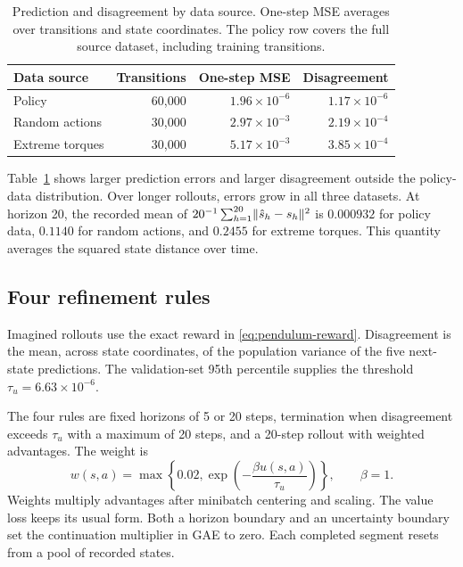 \begin{table}[t]
\centering
\caption{Prediction and disagreement by data source. One-step MSE averages over transitions and state coordinates. The policy row covers the full source dataset, including training transitions.}
\label{tab:prediction}
\begin{tabular}{lrrr}
\toprule
Data source & Transitions & One-step MSE & Disagreement\\
\midrule
Policy & 60,000 & $1.96\times10^{-6}$ & $1.17\times10^{-6}$\\
Random actions & 30,000 & $2.97\times10^{-3}$ & $2.19\times10^{-4}$\\
Extreme torques & 30,000 & $5.17\times10^{-3}$ & $3.85\times10^{-4}$\\
\bottomrule
\end{tabular}
\end{table}

Table~\ref{tab:prediction} shows larger prediction errors and larger disagreement outside the policy-data distribution. Over longer rollouts, errors grow in all three datasets. At horizon 20, the recorded mean of $20^{-1}\sum_{h=1}^{20}\lVert \hat s_h-s_h\rVert^2$ is $0.000932$ for policy data, $0.1140$ for random actions, and $0.2455$ for extreme torques. This quantity averages the squared state distance over time.

\subsection{Four refinement rules}

Imagined rollouts use the exact reward in \eqref{eq:pendulum-reward}. Disagreement is the mean, across state coordinates, of the population variance of the five next-state predictions. The validation-set 95th percentile supplies the threshold $\tau_u=6.63\times10^{-6}$.

The four rules are fixed horizons of 5 or 20 steps, termination when disagreement exceeds $\tau_u$ with a maximum of 20 steps, and a 20-step rollout with weighted advantages. The weight is
\begin{equation}
w(s,a)=\max\left\{0.02,\exp\left(-\frac{\beta u(s,a)}{\tau_u}\right)\right\},\qquad \beta=1.
\label{eq:implemented-weight}
\end{equation}
Weights multiply advantages after minibatch centering and scaling. The value loss keeps its usual form. Both a horizon boundary and an uncertainty boundary set the continuation multiplier in GAE to zero. Each completed segment resets from a pool of recorded states.

